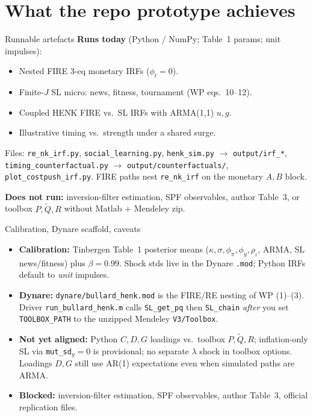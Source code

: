 \documentclass[11pt,aspectratio=169]{beamer}
\begin{document}
\section{What the repo prototype achieves}
\begin{frame}{Runnable artefacts}
  \textbf{Runs today} (Python / NumPy; Table~1 params; unit impulses):
  \begin{itemize}
    \item Nested FIRE 3-eq monetary IRFs ($\phi_t=0$).
    \item Finite-$J$ SL micro: news, fitness, tournament (WP eqs.\ 10--12).
    \item Coupled HENK FIRE vs.\ SL IRFs with ARMA(1,1) $u,g$.
    \item Illustrative timing vs.\ strength under a shared surge.
  \end{itemize}
  {\scriptsize
  Files: \texttt{re\_nk\_irf.py}, \texttt{social\_learning.py},
  \texttt{henk\_sim.py} $\to$ \texttt{output/irf\_*},
  \texttt{timing\_counterfactual.py} $\to$ \texttt{output/counterfactuals/},
  \texttt{plot\_costpush\_irf.py}.
  FIRE paths nest \texttt{re\_nk\_irf} on the monetary $A,B$ block.}
  \vspace{0.6em}

  \textbf{Does not run:} inversion-filter estimation, SPF observables,
  author Table~3, or toolbox $P,\widetilde Q,R$ without Matlab + Mendeley zip.
\end{frame}

\begin{frame}{Calibration, Dynare scaffold, caveats}
  \begin{itemize}
    \item \textbf{Calibration:} Tinbergen Table~1 posterior means
          ($\kappa,\sigma,\phi_\pi,\phi_y,\rho_\iota$, ARMA, SL news/fitness)
          plus $\beta=0.99$. Shock stds live in the Dynare \texttt{.mod};
          Python IRFs default to \emph{unit} impulses.
    \item \textbf{Dynare:} \texttt{dynare/bullard\_henk.mod} is the
          FIRE/RE nesting of WP (1)--(3). Driver
          \texttt{run\_bullard\_henk.m} calls \texttt{SL\_get\_pq} then
          \texttt{SL\_chain} \emph{after} you set \texttt{TOOLBOX\_PATH}
          to the unzipped Mendeley \texttt{V3/Toolbox}.
    \item \textbf{Not yet aligned:} Python $C,D,G$ loadings vs.\ toolbox
          $P,\widetilde Q,R$; inflation-only SL via
          \texttt{mut\_sd}$_y=0$ is provisional; no separate $\lambda$
          shock in toolbox options. Loadings $D,G$ still use AR(1)
          expectations even when simulated paths are ARMA.
    \item \textbf{Blocked:} inversion-filter estimation, SPF observables,
          author Table~3, official replication files.
  \end{itemize}
\end{frame}
\end{document}
